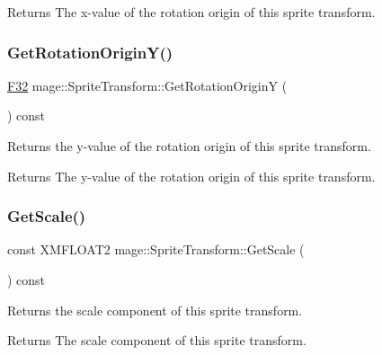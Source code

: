 \begin{DoxyReturn}{Returns}
The x-\/value of the rotation origin of this sprite transform. 
\end{DoxyReturn}
\hypertarget{classmage_1_1_sprite_transform_a762326097353f1303eede1b716cb9f51}{}\label{classmage_1_1_sprite_transform_a762326097353f1303eede1b716cb9f51} 
\subsubsection{\texorpdfstring{Get\+Rotation\+Origin\+Y()}{GetRotationOriginY()}}
{\footnotesize\ttfamily \hyperlink{namespacemage_aa97e833b45f06d60a0a9c4fc22ae02c0}{F32} mage\+::\+Sprite\+Transform\+::\+Get\+Rotation\+OriginY (\begin{DoxyParamCaption}{ }\end{DoxyParamCaption}) const\hspace{0.3cm}{\ttfamily [noexcept]}}

Returns the y-\/value of the rotation origin of this sprite transform.

\begin{DoxyReturn}{Returns}
The y-\/value of the rotation origin of this sprite transform. 
\end{DoxyReturn}
\hypertarget{classmage_1_1_sprite_transform_ac62a9a5b40abbbb40398885010990e55}{}\label{classmage_1_1_sprite_transform_ac62a9a5b40abbbb40398885010990e55} 
\subsubsection{\texorpdfstring{Get\+Scale()}{GetScale()}}
{\footnotesize\ttfamily const X\+M\+F\+L\+O\+A\+T2 mage\+::\+Sprite\+Transform\+::\+Get\+Scale (\begin{DoxyParamCaption}{ }\end{DoxyParamCaption}) const\hspace{0.3cm}{\ttfamily [noexcept]}}

Returns the scale component of this sprite transform.

\begin{DoxyReturn}{Returns}
The scale component of this sprite transform. 
\end{DoxyReturn}
\hypertarget{classmage_1_1_sprite_transform_af82246da3228dfc1588ca806ddf6315f}{}\label{classmage_1_1_sprite_transform_af82246da3228dfc1588ca806ddf6315f} 
